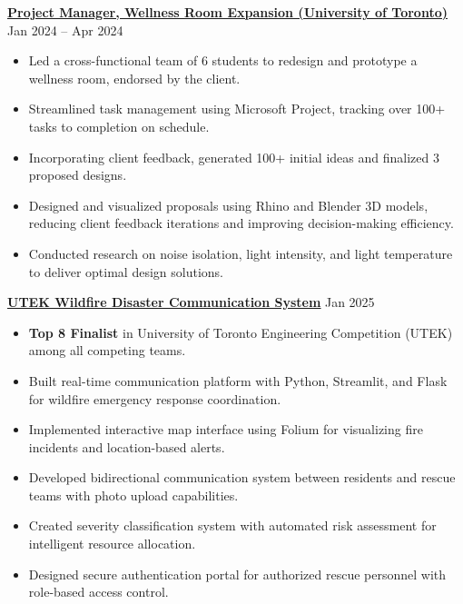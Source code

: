 \documentclass[a4paper,10pt]{article}
\begin{document}
\vspace{0.3cm}
\noindent\href{https://github.com/Ken-2511/wellness-room-expansion}{\uline{
\textbf{Project Manager, Wellness Room Expansion (University of Toronto)}}} \hfill Jan 2024 -- Apr 2024
\begin{itemize}[leftmargin=0.2in]
    \item Led a cross-functional team of 6 students to redesign and prototype a wellness room, endorsed by the client.
    \item Streamlined task management using Microsoft Project, tracking over 100+ tasks to completion on schedule.
    \item Incorporating client feedback, generated 100+ initial ideas and finalized 3 proposed designs.
    \item Designed and visualized proposals using Rhino and Blender 3D models, reducing client feedback iterations and improving decision-making efficiency.
    \item Conducted research on noise isolation, light intensity, and light temperature to deliver optimal design solutions.
\end{itemize}

\vspace{0.3cm}
\noindent\href{https://github.com/Ken-2511/utek_disaster_communication_system}{\uline{
\textbf{UTEK Wildfire Disaster Communication System}}} \hfill Jan 2025
\begin{itemize}[leftmargin=0.2in]
    \item \textbf{Top 8 Finalist} in University of Toronto Engineering Competition (UTEK) among all competing teams.
    \item Built real-time communication platform with Python, Streamlit, and Flask for wildfire emergency response coordination.
    \item Implemented interactive map interface using Folium for visualizing fire incidents and location-based alerts.
    \item Developed bidirectional communication system between residents and rescue teams with photo upload capabilities.
    \item Created severity classification system with automated risk assessment for intelligent resource allocation.
    \item Designed secure authentication portal for authorized rescue personnel with role-based access control.
\end{itemize}
\end{document}
